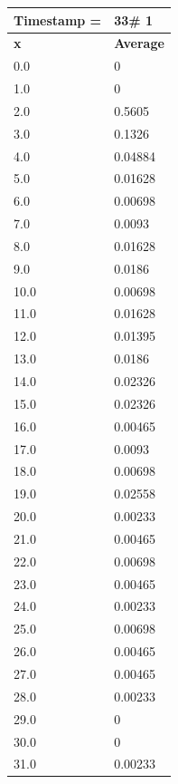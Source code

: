 \begin{tabular}{|l||l|}
\hline
\textbf{Timestamp =} & \textbf{33}\# 1\\\hline
	\textbf{x} & \textbf{Average} \\ \hline
\hline
	0.0 & 0 \\ \hline
	1.0 & 0 \\ \hline
	2.0 & 0.5605 \\ \hline
	3.0 & 0.1326 \\ \hline
	4.0 & 0.04884 \\ \hline
	5.0 & 0.01628 \\ \hline
	6.0 & 0.00698 \\ \hline
	7.0 & 0.0093 \\ \hline
	8.0 & 0.01628 \\ \hline
	9.0 & 0.0186 \\ \hline
	10.0 & 0.00698 \\ \hline
	11.0 & 0.01628 \\ \hline
	12.0 & 0.01395 \\ \hline
	13.0 & 0.0186 \\ \hline
	14.0 & 0.02326 \\ \hline
	15.0 & 0.02326 \\ \hline
	16.0 & 0.00465 \\ \hline
	17.0 & 0.0093 \\ \hline
	18.0 & 0.00698 \\ \hline
	19.0 & 0.02558 \\ \hline
	20.0 & 0.00233 \\ \hline
	21.0 & 0.00465 \\ \hline
	22.0 & 0.00698 \\ \hline
	23.0 & 0.00465 \\ \hline
	24.0 & 0.00233 \\ \hline
	25.0 & 0.00698 \\ \hline
	26.0 & 0.00465 \\ \hline
	27.0 & 0.00465 \\ \hline
	28.0 & 0.00233 \\ \hline
	29.0 & 0 \\ \hline
	30.0 & 0 \\ \hline
	31.0 & 0.00233 \\ \hline
\end{tabular}

